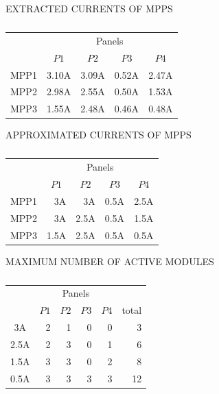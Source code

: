 \documentclass[conference]{pvsctran}
\begin{document}
\begin{table}[t]
\centering
\caption{}
\centerline{EXTRACTED CURRENTS OF MPPS}
\vskip5pt
\begin{tabular}{c|rrrr}
\hline\hline
       &    	\multicolumn{4}{c}{Panels}								\\
	&	\multicolumn{1}{c}{$P1$}	&	\multicolumn{1}{c}{$P2$}	&	\multicolumn{1}{c}{$P3$}	&	\multicolumn{1}{c}{$P4$}	\\ \hline
MPP1	&	3.10A	&	3.09A	&	0.52A	&	2.47A	\\ \hline
MPP2	&	2.98A	&	2.55A	&	0.50A	&	1.53A	\\ \hline
MPP3	&	1.55A	&	2.48A	&	0.46A	&	0.48A	\\ \hline
\end{tabular}
\label{tab:monitored}
\end{table}

\begin{table}[t]
\centering
\caption{}
\centerline{APPROXIMATED CURRENTS OF MPPS}
\vskip5pt
\begin{tabular}{c|rrrr}	
\hline\hline
       &    	\multicolumn{4}{c}{Panels}	\\
	&	\multicolumn{1}{c}{$P1$}	&	\multicolumn{1}{c}{$P2$}	&	\multicolumn{1}{c}{$P3$}	&	\multicolumn{1}{c}{$P4$}	\\ \hline
MPP1	&	3A	&	3A	&	0.5A	&	2.5A	\\ \hline
MPP2	&	3A	&	2.5A	&	0.5A	&	1.5A	\\ \hline
MPP3	&	1.5A	&	2.5A	&	0.5A	&	0.5A	\\ \hline
\end{tabular}
\label{tab:approximated}
\end{table}

\begin{table}[t]
\centering
\caption{}
\centerline{MAXIMUM NUMBER OF ACTIVE MODULES}
\vskip5pt
\begin{tabular}{c|rrrr|r}	
\hline\hline
       &    	\multicolumn{4}{c|}{Panels}	& \\									
	&	\multicolumn{1}{c}{$P1$}	&	\multicolumn{1}{c}{$P2$}	&	\multicolumn{1}{c}{$P3$}	&	\multicolumn{1}{c}{$P4$} &	\multicolumn{1}{|c}{total}	\\ \hline
3A	&	2	&	1	&	0	&	0 & 3	\\ \hline
2.5A	&	2	&	3	&	0	&	1 & 6	\\ \hline
1.5A	&	3	&	3	&	0	&	2 & 8	\\ \hline
0.5A	&	3	&	3	&	3	&	3 & 12	\\ \hline
\end{tabular}
\label{tab:modules}
\end{table}
\end{document}

